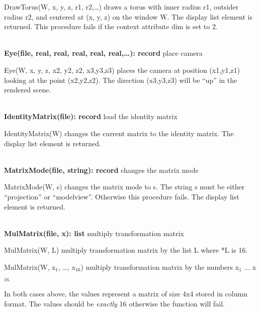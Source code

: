 \documentclass[letterpaper]{article}
\newcommand\textsubscript[1]{\ensuremath{{}_{\text{#1}}}}
\begin{document}
\bigskip

\textsf{DrawTorus(W, x, y, z, r1, r2,{\dots})} draws a torus with
inner radius r1, outsider radius r2, and centered at (x, y, z) on the
window W. The display list element is returned. This procedure fails
if the context attribute dim is set to 2.

\noindent\hrulefill\\
\noindent\textsf{\textbf{Eye(file, real, real, real, real, real,{\dots}): record}} \hfill place camera


\bigskip

{
\textsf{Eye(W, x, y, z, x2, y2, z2, x3,y3,z3)} places the camera at position (x1,y1,z1) looking at the point
(x2,y2,z2). The direction (x3,y3,z3) will be ``up'' in the rendered scene.}

\noindent\hrulefill\\
\noindent\textsf{\textbf{IdentityMatrix(file): record}}
\hfill load the identity matrix


\bigskip

\textsf{IdentityMatrix(W)} changes the current matrix to the identity
matrix. The display list element is returned.


\bigskip

\noindent\hrulefill\\
\noindent\textsf{\textbf{MatrixMode(file, string): record}}
\hfill changes the matrix mode


\bigskip

{
\textsf{MatrixMode(W, s)} changes the matrix mode to s. The string s must be either \textsf{{}``projection''} or
\textsf{{}``modelview''.} Otherwise this procedure fails. The display list element is returned. }


\bigskip

\noindent\hrulefill\\
\noindent\textsf{\textbf{MulMatrix(file, x): list}}
\hfill multiply transformation matrix


\bigskip

\textsf{MulMatrix(W, L)} multiply transformation matrix by the list L
where *L is 16.

{
\textsf{MulMatrix(W, x}\textsf{\textsubscript{1}}\textsf{, {\dots}, x}\textsf{\textsubscript{16}}\textsf{) }multiply
transformation matrix by the numbers x\textsubscript{1} ... x\textsubscript{16.}}

In both cases above, the values represent a matrix of size 4x4 stored
in column format. The values should be {\em exactly\/} 16
otherwise the function will fail.
\end{document}

